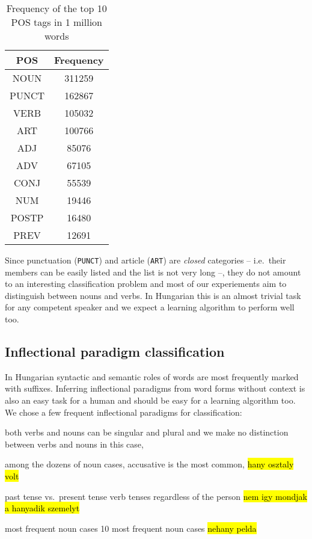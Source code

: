 \documentclass{article}
\begin{document}
\begin{table}[t]
  \caption{Frequency of the top 10 POS tags in 1 million words}
  \label{table:pos-tags}
  \centering
  \begin{tabular}{cc}
      \toprule
      POS & Frequency \\
      \midrule
      NOUN & 311259 \\
      PUNCT & 162867 \\
      VERB & 105032 \\
      ART & 100766 \\
      ADJ & 85076 \\
      ADV & 67105 \\
      CONJ & 55539 \\
      NUM & 19446 \\
      POSTP & 16480 \\
      PREV & 12691 \\
      \bottomrule
  \end{tabular}
\end{table}

Since punctuation (\texttt{PUNCT}) and article (\texttt{ART}) are \emph{closed} categories -- i.e.~their members can be easily listed and the list is not very long --, they do not amount to an interesting classification problem and most of our experiements aim to distinguish between nouns and verbs.
In Hungarian this is an almost trivial task for any competent speaker and we expect a learning algorithm to perform well too.

\subsection{Inflectional paradigm classification}

In Hungarian syntactic and semantic roles of words are most frequently marked with suffixes.
Inferring inflectional paradigms from word forms without context is also an easy task for a human and should be easy for a learning algorithm too.
We chose a few frequent inflectional paradigms for classification:

\begin{description}
    \item[singular vs.~plural] both verbs and nouns can be singular and plural and we make no distinction between verbs and nouns in this case,
    \item[accusative vs.~other noun cases] among the dozens of noun cases, accusative is the most common, \hl{hany osztaly volt}
    \item{past tense vs.~present tense} verb tenses regardless of the person \hl{nem igy mondjak a hanyadik szemelyt}
    \item{most frequent noun cases} 10 most frequent noun cases \hl{nehany pelda}
\end{description}
\end{document}
